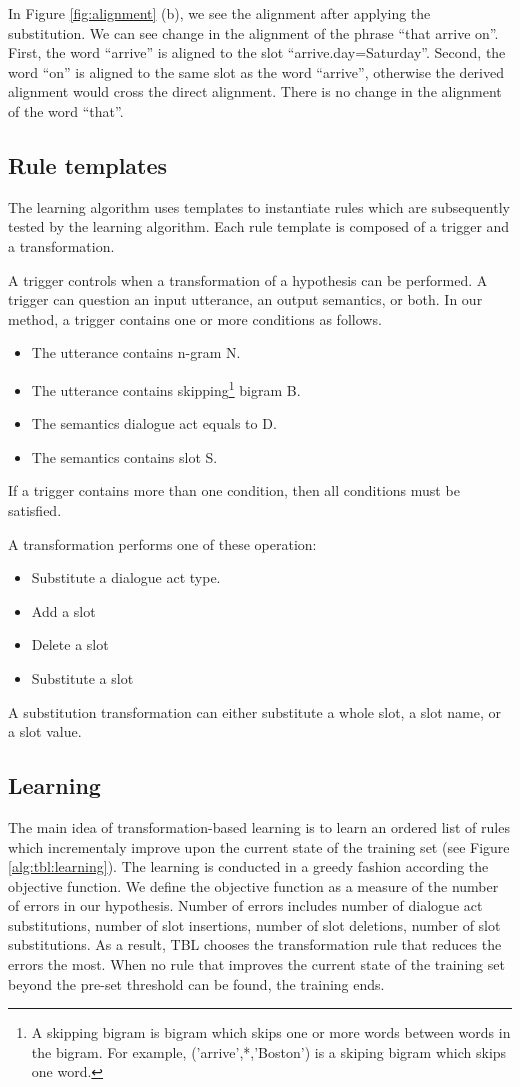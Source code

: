\documentclass[11pt]{article}
\begin{document}
In Figure \ref{fig:alignment} (b), we see the alignment after applying the substitution. We can see change in the alignment of the phrase ``that arrive on''. First, the word ``arrive'' is aligned to the slot ``arrive.day=Saturday''. Second, the word ``on'' is aligned to the same slot as the word ``arrive'',   otherwise the derived alignment would cross the direct alignment. There is no change in the alignment of the word ``that''.

\subsection{Rule templates}
The learning algorithm uses templates to instantiate rules which are subsequently tested by the learning algorithm. Each rule template is composed of a trigger and a transformation. 

A trigger controls when a transformation of a hypothesis can be performed. A trigger can question an input utterance, an output semantics, or both. In our method, a trigger contains one or more conditions as follows.
\begin{itemize}
  \item The utterance contains n-gram N.
  \item The utterance contains skipping\footnote{A skipping bigram is bigram which skips one or more words between words in the bigram. For example, ('arrive',*,'Boston') is a skiping bigram which skips one word.} bigram B.
  \item The semantics dialogue act equals to D.
  \item The semantics contains slot S.
\end{itemize}
If a trigger contains more than one condition, then all conditions must be satisfied. 

A transformation performs one of these operation:
\begin{itemize}
  \item Substitute a dialogue act type.
  \item Add a slot
  \item Delete a slot
  \item Substitute a slot
\end{itemize}
A substitution transformation can either substitute a whole slot, a slot name, or a slot value.

\subsection{Learning} \label{sec:tbl:learning}
The main idea of transformation-based learning is to learn an ordered list of rules which incrementaly improve upon the current state of the training set (see Figure \ref{alg:tbl:learning}). The learning is conducted in a greedy fashion according the objective function. We define the objective function as a measure of the number of errors in our hypothesis. Number of errors includes number of dialogue act substitutions, number of slot insertions, number of slot deletions, number of slot substitutions. As a result, TBL chooses the transformation rule that reduces the errors the most. When no rule that improves the current state of the training set beyond the pre-set threshold can be found, the training ends.
\end{document}
